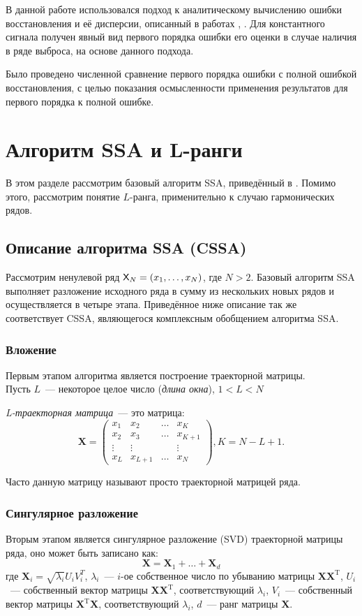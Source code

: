 \documentclass[specialist,
               substylefile = spbu.rtx,
               subf,href,colorlinks=true, 12pt]{disser}
\begin{document}
В данной работе использовался подход к аналитическому вычислению ошибки восстановления и её дисперсии, описанный в работах \cite{Nekr2008}, \cite{Vlas2008}. Для константного сигнала получен явный вид первого порядка ошибки его оценки в случае наличия в ряде выброса, на основе данного подхода.

Было проведено численной сравнение первого порядка ошибки с полной ошибкой восстановления, с целью показания осмысленности применения результатов для первого порядка к полной ошибке. 
 

\chapter{Алгоритм SSA и L-ранги}
В этом разделе рассмотрим базовый алгоритм SSA, приведённый в \cite{Golyandina.etal2001}. Помимо этого, рассмотрим понятие $L$-ранга, применительно к случаю гармонических рядов.  
\section{Описание алгоритма SSA (CSSA)}
Рассмотрим ненулевой ряд $\textsf{X}_N = (x_1, \ldots, x_{N})$, где $N > 2$. Базовый алгоритм SSA выполняет разложение исходного ряда в сумму из нескольких новых рядов и осуществляется в четыре этапа. Приведённое ниже описание так же соответствует CSSA, являющегося комплексным обобщением алгоритма SSA.
\subsection{Вложение}
Первым этапом алгоритма является построение траекторной матрицы.\\
Пусть $L$~--- некоторое целое число (\textit{длина окна}), $1 < L < N$

\textit{L-траекторная матрица}~--- это матрица:
$$\mathbf{X} = \begin{pmatrix}
           x_1 & x_2 & \ldots & x_{K}\\
           x_2 & x_3 & \ldots & x_{K+1}\\
           \vdots & \vdots & & \vdots\\
           x_{L} & x_{L+1} & \ldots & x_{N}
         \end{pmatrix}, K = N - L + 1.$$

Часто данную матрицу называют просто траекторной матрицей ряда.
\subsection{Сингулярное разложение}
Вторым этапом является сингулярное разложение (SVD) траекторной матрицы ряда, оно может быть записано как:
$$\mathbf{X} = \mathbf{X}_1 + \ldots + \mathbf{X}_d$$
где $\mathbf{X}_i = \sqrt{\lambda_i}U_i V_i^T$, $\lambda_i$~--- $i$-ое собственное число по убыванию матрицы $\mathbf{X} \mathbf{X}^{\mathrm{T}}$, $U_i$~--- собственный вектор матрицы $\mathbf{X} \mathbf{X}^{\mathrm{T}}$, соответствующий $\lambda_i$, $V_i$~--- собственный вектор матрицы $\mathbf{X}^{\mathrm{T}} \mathbf{X}$, соответствующий $\lambda_i$, $d$~--- ранг матрицы $\mathbf{X}$.
\end{document}
